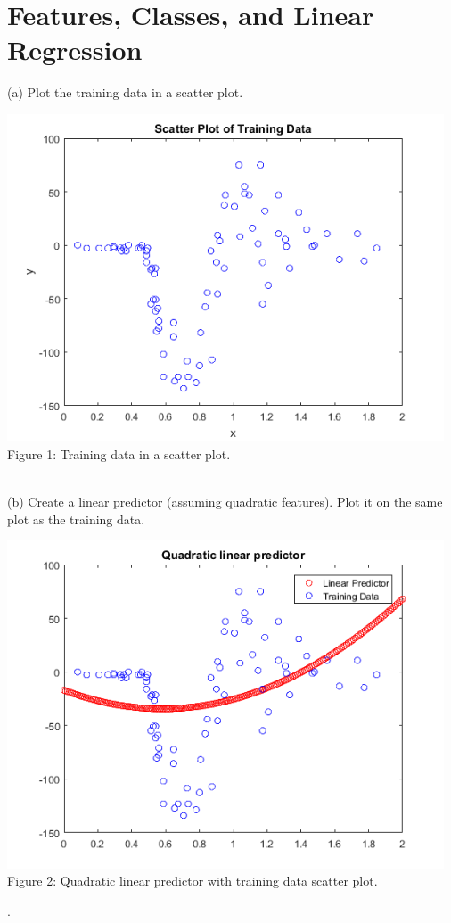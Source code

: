 \documentclass[]{report}   %
\begin{document}
\section{Features, Classes, and Linear Regression}
(a) Plot the training data in a scatter plot.
\begin{center}
	\includegraphics[width=35em]{2_1_Figure_1.png}
	{Figure 1: Training data in a scatter plot.}
\end{center} 
~\\
(b) Create a linear predictor (assuming quadratic features). Plot it on the same plot as the training data.
\begin{center}
	\includegraphics[width=35em]{2_1_Figure_2.png}
	{Figure 2: Quadratic linear predictor with training data scatter plot.}
\end{center}.
\end{document}
